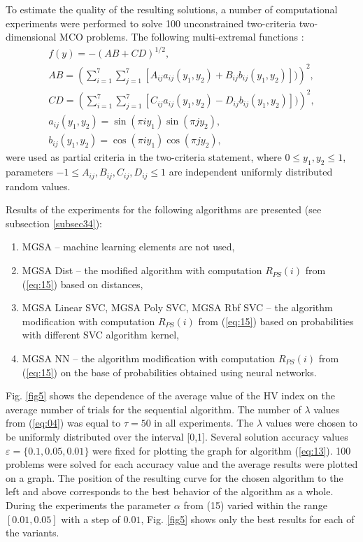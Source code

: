 \documentclass[runningheads]{llncs}
\begin{document}
To estimate the quality of the resulting solutions, a number of computational experiments were performed to solve 100 unconstrained two-criteria two-dimensional MCO problems. The following multi-extremal functions \cite{Gergel2019_2}:
\begin{equation}
    \label{eq:16}
		\begin{matrix}
		  f(y)= -(AB + CD)^{1/2}, \\
			AB =(\sum_{i=1}^7{\sum_{j=1}^7{[A_{ij} a_{ij} (y_1,y_2) + B_{ij} b_{ij} (y_1,y_2)])}})^2, \\
			CD =(\sum_{i=1}^7{\sum_{j=1}^7{[C_{ij} a_{ij} (y_1,y_2) - D_{ij} b_{ij} (y_1,y_2)])}})^2, \\
			a_{ij} (y_1,y_2) = \sin(\pi i y_1) \sin(\pi j y_2), \\
			b_{ij} (y_1,y_2) = \cos(\pi i y_1) \cos(\pi j y_2),
		\end{matrix}
\end{equation}
were used as partial criteria in the two-criteria statement, where $0 \leq y_1, y_2 \leq 1$, parameters $-1 \leq A_{ij},B_{ij},C_{ij},D_{ij} \leq 1$ are independent uniformly distributed random values.

Results of the experiments for the following algorithms are presented (see subsection \ref{subsec34}):
\begin{enumerate}
	\item MGSA -- machine learning elements are not used,
	\item MGSA Dist -- the modified algorithm with computation $R_{PS}(i)$ from (\ref{eq:15}) based on distances,
	\item MGSA Linear SVC, MGSA Poly SVC, MGSA Rbf SVC -- the algorithm modification with computation $R_{PS}(i)$ from (\ref{eq:15}) based on probabilities with different SVC algorithm kernel,
	\item MGSA NN -- the algorithm modification with computation $R_{PS}(i)$ from (\ref{eq:15}) on the base of probabilities obtained using neural networks.
\end{enumerate}
	
Fig. \ref{fig5} shows the dependence of the average value of the HV index on the average number of trials for the sequential algorithm. The number of $\lambda$ values from (\ref{eq:04}) was equal to $\tau=50$ in all experiments. The $\lambda$ values were chosen to be uniformly distributed over the interval [0,1]. Several solution accuracy values $\varepsilon = \{0.1,0.05,0.01\}$ were fixed for plotting the graph for algorithm (\ref{eq:13}). 100 problems were solved for each accuracy value and the average results were plotted on a graph. The position of the resulting curve for the chosen algorithm to the left and above corresponds to the best behavior of the algorithm as a whole. During the experiments the parameter $\alpha$ from (15) varied within the range $[0.01,0.05]$ with a step of $0.01$, Fig. \ref{fig5} shows only the best results for each of the variants.
\end{document}
